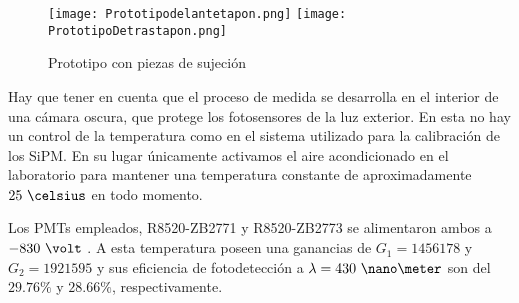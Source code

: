 \begin{figure}[htb]
\centering
{
\texttt{[image: Prototipodelantetapon.png]} 
}
{
\texttt{[image: PrototipoDetrastapon.png]} 
}
\caption{Prototipo con piezas de sujeción \label{prototipotapones}}
\end{figure} 

Hay que tener en cuenta que el proceso de medida se desarrolla en el interior de una cámara oscura, que  protege los fotosensores  de la  luz exterior. En esta no hay un control de la temperatura como en el sistema utilizado para la calibración de los SiPM. En su lugar únicamente activamos el aire acondicionado en el laboratorio para mantener una temperatura constante de aproximadamente $25~\celsius$ en todo momento.

Los PMTs empleados, R8520-ZB2771 y R8520-ZB2773 se alimentaron ambos a $-830~\volt$ . A esta temperatura poseen  una ganancias de $G_1=1456178$ y $G_2=1921595$ y sus eficiencia de fotodetección a $\lambda=430~\nano\meter$ son del $29.76\%$ y $28.66\%$, respectivamente. 
